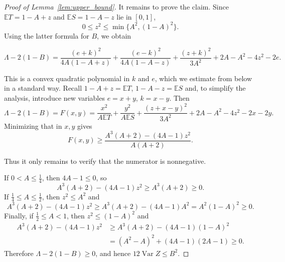 \documentclass[10pt,a4paper]{amsart}
\newcommand{\E}{\mathbb E}
\newcommand{\Var}{\operatorname{Var}}
\begin{document}
\begin{proof}[Proof of Lemma~\ref{lem:upper_bound}]
It remains to prove the claim. Since
$\E T=1-A+z$ and $\E S=1-A-z$ lie in $[0,1]$,
$$
 0\le z^2\le\min\{A^2,(1-A)^2\}.
$$
Using the latter formula for $B$, we obtain

$$ \Lambda-2(1-B)
 ={}\frac{(e+k)^2}{4A(1-A+z)}
 +\frac{(e-k)^2}{4A(1-A-z)}
 +\frac{(z+k)^2}{3A^2}
 +2A-A^2-4z^2-2e.$$

This is a convex quadratic polynomial in $k$ and $e$, which we estimate from below in a standard way. Recall $1-A+z = \E T$, $1-A-z=\E S$ and, to simplify the analysis, introduce new variables $e=x+y$, $k=x-y$. Then
$$\Lambda-2(1-B) = F(x,y) = \frac{x^2}{A \E T} + \frac{y^2}{A \E S} + \frac{(z+x-y)^2}{3A^2} + 2A-A^2-4z^2-2x-2y.$$
Minimizing that in $x,y$ gives
$$F(x,y) \geq \frac{A^3(A+2)-(4A-1)z^2}{A(A+2)}.$$

%
%
%
%






Thus it only remains to verify that the numerator is nonnegative.






If $0<A\le\frac14$, then $4A-1\le0$, so $$A^3(A+2)-(4A-1)z^2\ge A^3(A+2) \geq 0.$$ If
$\frac14\le A\le\frac12$, then $z^2\le A^2$ and
$$
 A^3(A+2)-(4A-1)z^2\ge A^3(A+2)-(4A-1)A^2
 =A^2(1-A)^2\ge0.
$$
Finally, if $\frac12\le A<1$, then $z^2\le(1-A)^2$ and
$$
 \begin{aligned}
 A^3(A+2)-(4A-1)z^2&\ge A^3(A+2)-(4A-1)(1-A)^2\\
  &=(A^2-A)^2+(4A-1)(2A-1)\ge0.
 \end{aligned}
$$
Therefore $\Lambda-2(1-B)\ge0$, and hence $12\Var Z\le B^2$.

\end{proof}
\end{document}
